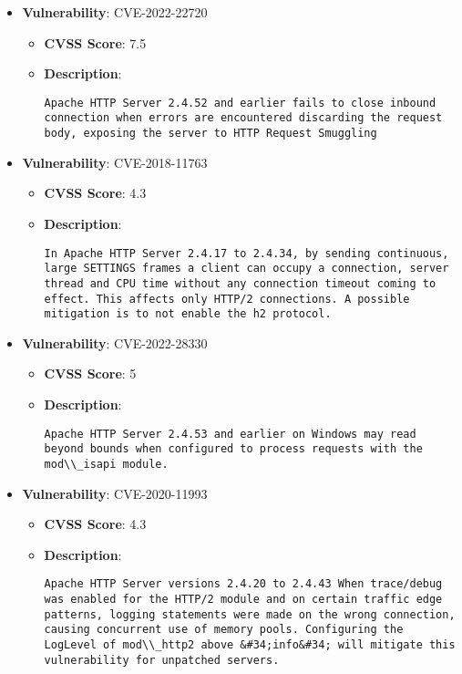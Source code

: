 \documentclass{article}
\begin{document}
\begin{itemize}
        \item \textbf{Vulnerability}: CVE-2022-22720
        \begin{itemize}
            \item \textbf{CVSS Score}:  7.5 
            \item \textbf{Description}:
            \parbox[t]{0.9\linewidth}{
                \verb|Apache HTTP Server 2.4.52 and earlier fails to close inbound connection when errors are encountered discarding the request body, exposing the server to HTTP Request Smuggling|
            }
        \end{itemize}
    
        \item \textbf{Vulnerability}: CVE-2018-11763
        \begin{itemize}
            \item \textbf{CVSS Score}:  4.3 
            \item \textbf{Description}:
            \parbox[t]{0.9\linewidth}{
                \verb|In Apache HTTP Server 2.4.17 to 2.4.34, by sending continuous, large SETTINGS frames a client can occupy a connection, server thread and CPU time without any connection timeout coming to effect. This affects only HTTP/2 connections. A possible mitigation is to not enable the h2 protocol.|
            }
        \end{itemize}
    
        \item \textbf{Vulnerability}: CVE-2022-28330
        \begin{itemize}
            \item \textbf{CVSS Score}:  5 
            \item \textbf{Description}:
            \parbox[t]{0.9\linewidth}{
                \verb|Apache HTTP Server 2.4.53 and earlier on Windows may read beyond bounds when configured to process requests with the mod\\_isapi module.|
            }
        \end{itemize}
    
        \item \textbf{Vulnerability}: CVE-2020-11993
        \begin{itemize}
            \item \textbf{CVSS Score}:  4.3 
            \item \textbf{Description}:
            \parbox[t]{0.9\linewidth}{
                \verb|Apache HTTP Server versions 2.4.20 to 2.4.43 When trace/debug was enabled for the HTTP/2 module and on certain traffic edge patterns, logging statements were made on the wrong connection, causing concurrent use of memory pools. Configuring the LogLevel of mod\\_http2 above &#34;info&#34; will mitigate this vulnerability for unpatched servers.|
            }
        \end{itemize}
    

\end{itemize}
\end{document}

